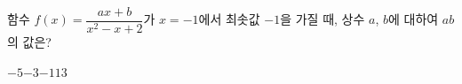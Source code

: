 함수 $f(x)=\dfrac{ax+b}{x^2-x+2}$가 $x=-1$에서 최솟값 $-1$을 가질 때, 상수 $a$, $b$에 대하여 $ab$의 값은?
\begin{choices32}{$-5$}{$-3$}{$-1$}{$1$}{$3$}\end{choices32}
